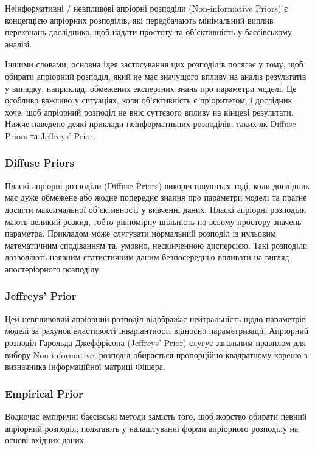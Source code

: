 Неінформативні / невпливові апріорні розподіли (Non-informative Priors) є концепцією апріорних розподілів, які передбачають мінімальний виплив переконань дослідника, щоб надати простоту та об'єктивність у баєсівському аналізі.

Іншими словами, основна ідея застосування цих розподілів полягає у тому, щоб обирати апріорний розподіл, який не має значущого впливу на аналіз результатів у випадку, наприклад. обмежених експертних знань про параметри моделі. Це особливо важливо у ситуаціях, коли об’єктивність є пріоритетом, і дослідник хоче, щоб апріорний розподіл не вніс суттєвого впливу на кінцеві результати. Нижче наведено деякі приклади неінформативних розподілів, таких як Diffuse Priors та Jeffreys’ Prior.

\subsubsection*{Diffuse Priors}

Пласкі апріорні розподіли (Diffuse Priors) використовуються тоді, коли дослідник має дуже обмежене або жодне попереднє знання про параметри моделі та прагне досягти максимальної об'єктивності у вивченні даних. Пласкі апріорні розподіли мають великий розкид, тобто рівномірну щільність по всьому простору значень  параметра. Прикладом може слугувати нормальний розподіл із нульовим математичним сподіванням та, умовно, нескінченною дисперсією. Такі розподіли дозволяють наявним статистичним даним безпосередньо впливати на вигляд апостеріорного розподілу.

\subsubsection*{Jeffreys’ Prior}

Цей невпливовий апріорний розподіл  відображає нейтральність щодо параметрів моделі за рахунок властивості інваріантності відносно параметризації. Апріорний розподіл Гарольда Джеффрісона (Jeffreys’ Prior) слугує загальним правилом для вибору Non-informative: розподіл обирається пропорційно квадратному кореню з визначника інформаційної матриці Фішера.

\subsubsection*{Empirical Prior}

Водночас емпіричні баєсівські методи замість того, щоб жорстко обирати певний апріорний розподіл, полягають у налаштуванні форми апріорного розподілу на основі вхідних даних.

